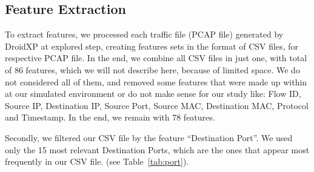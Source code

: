 \subsection{Feature Extraction}\label{sec:extraction}


To extract features, we processed each traffic file (PCAP file) generated by DroidXP at explored step, creating features sets in the format of CSV files, for respective PCAP file. In the end, we combine all CSV files in just one, with total of 86 features, which we will not describe here, because of limited space. We do not considered all of them, and removed some features that were made up within at our simulated environment or do not make sense for our study like: Flow ID, Source IP, Destination IP, Source Port, Source MAC, Destination MAC, Protocol and Timestamp. In the end, we remain with 78 features.

Secondly, we filtered our CSV file by the feature ``Destination Port''. We used only the 15 most relevant Destination Ports, which are the ones that appear most frequently in our CSV file. (see Table~\ref{tab:port}).

